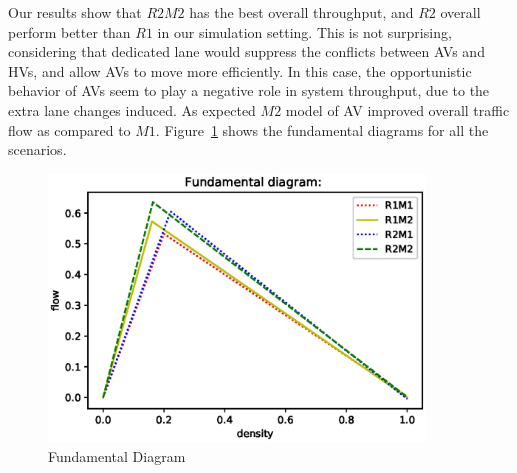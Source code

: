 \documentclass[oneside,letter,11pt]{article}
\begin{document}
Our results show that $R2M2$ has the best overall throughput, and $R2$ overall perform better than $R1$ in our simulation setting. This is not surprising, considering that dedicated lane would suppress the conflicts between AVs and HVs, and allow AVs to move more efficiently. In this case, the opportunistic behavior of AVs seem to play a negative role in system throughput, due to the extra lane changes induced. As expected $M2$ model of AV improved overall traffic flow as compared to $M1$. Figure~\ref{fig:fdtri} shows the fundamental diagrams for all the scenarios.

\begin{figure}[H]
\centering
  \includegraphics[width= 10cm]{tricomp}
  \vspace{-0.6cm}
  \caption{Fundamental Diagram}
    \vspace{-0.2cm}
  \label{fig:fdtri}
\end{figure}
\end{document}
